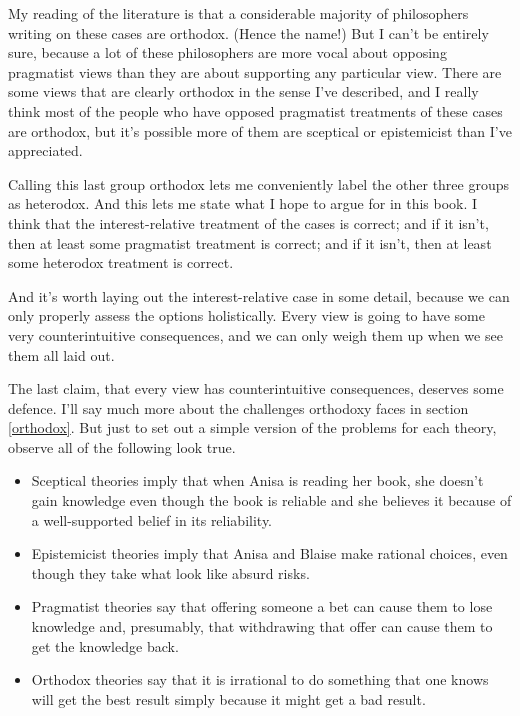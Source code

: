 \documentclass[11pt,]{book}
\providecommand{\tightlist}{%
  \setlength{\itemsep}{0pt}\setlength{\parskip}{0pt}}
\begin{document}
My reading of the literature is that a considerable majority of philosophers writing on these cases are orthodox. (Hence the name!) But I can't be entirely sure, because a lot of these philosophers are more vocal about opposing pragmatist views than they are about supporting any particular view. There are some views that are clearly orthodox in the sense I've described, and I really think most of the people who have opposed pragmatist treatments of these cases are orthodox, but it's possible more of them are sceptical or epistemicist than I've appreciated.

Calling this last group orthodox lets me conveniently label the other three groups as heterodox. And this lets me state what I hope to argue for in this book. I think that the interest-relative treatment of the cases is correct; and if it isn't, then at least some pragmatist treatment is correct; and if it isn't, then at least some heterodox treatment is correct.

And it's worth laying out the interest-relative case in some detail, because we can only properly assess the options holistically. Every view is going to have some very counterintuitive consequences, and we can only weigh them up when we see them all laid out.

The last claim, that every view has counterintuitive consequences, deserves some defence. I'll say much more about the challenges orthodoxy faces in section \ref{orthodox}. But just to set out a simple version of the problems for each theory, observe all of the following look true.

\begin{itemize}
\tightlist
\item
  Sceptical theories imply that when Anisa is reading her book, she doesn't gain knowledge even though the book is reliable and she believes it because of a well-supported belief in its reliability.
\item
  Epistemicist theories imply that Anisa and Blaise make rational choices, even though they take what look like absurd risks.
\item
  Pragmatist theories say that offering someone a bet can cause them to lose knowledge and, presumably, that withdrawing that offer can cause them to get the knowledge back.
\item
  Orthodox theories say that it is irrational to do something that one knows will get the best result simply because it might get a bad result.
\end{itemize}
\end{document}
